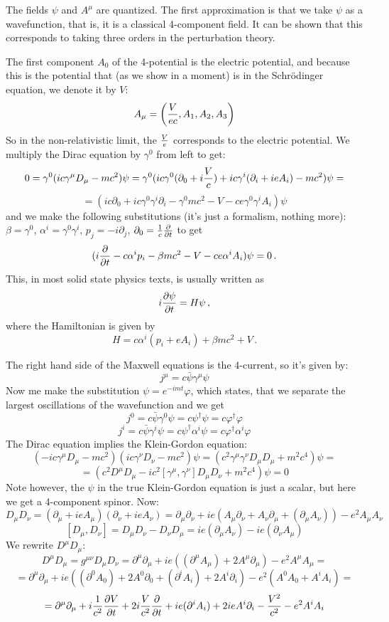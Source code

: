 The fields $\psi$ and $A^\mu$ are quantized. The first approximation is that we
take $\psi$ as a wavefunction, that is, it is a classical 4-component field. It
can be shown that this corresponds to taking three orders in the perturbation
theory.

The first component $A_0$ of the 4-potential is the electric potential, and
because this is the potential that (as we show in a moment) is in the
Schr\"odinger equation, we denote it by $V$:
$$A_\mu=\left({V\over ec},A_1,A_2,A_3\right)$$
So in the non-relativistic limit, the $V\over e$ corresponds to the electric
potential.  We multiply the Dirac equation by $\gamma^0$ from left to get:
$$0=\gamma^0(ic\gamma^\mu D_\mu-mc^2)\psi=
\gamma^0(ic\gamma^0(\partial_0+i{V\over c})+ic\gamma^i
(\partial_i+ieA_i)-mc^2)\psi=$$
$$=
(ic\partial_0+ic\gamma^0\gamma^i\partial_i-\gamma^0mc^2-V
-ce\gamma^0\gamma^iA_i)\psi
$$
and we make the following substitutions (it's just a formalism, nothing more):
$\beta=\gamma^0$, $\alpha^i=\gamma^0\gamma^i$, $p_j=-i\partial_j$,
$\partial_0={1\over c}{\partial\over\partial t}$
to get
$$(i{\partial\over\partial t}-c\alpha^i p_i-\beta
mc^2-V-ce\alpha^iA_i)\psi=0\,.$$
This, in most solid state physics texts, is usually written as
$$ i{\partial\psi\over\partial t}=H\psi\,,$$
where the Hamiltonian is given by
$$ H=c\alpha^i(p_i+eA_i)+\beta mc^2+V\,.$$

The right hand side of the Maxwell equations is the 4-current, so it's given
by:
$$j^\mu=c\bar\psi\gamma^\mu\psi$$
Now me make the substitution $\psi=e^{-imt}\varphi$, which states, that we
separate the largest oscillations of the wavefunction and we get
$$j^0=c\bar\psi\gamma^0\psi=c\psi^\dagger\psi=c\varphi^\dagger\varphi$$
$$j^i=c\bar\psi\gamma^i\psi=c\psi^\dagger\alpha^i\psi=c\varphi^\dagger\alpha^i\varphi$$
The Dirac equation implies the Klein-Gordon equation:
$$(-ic\gamma^\mu D_\mu-mc^2)(ic\gamma^\nu D_\nu-mc^2)\psi=
(c^2\gamma^\mu\gamma^\nu D_\mu D_\mu+m^2c^4)\psi=
$$
$$
=(c^2D^\mu D_\mu-ic^2[\gamma^\mu,\gamma^\nu]D_\mu D_\nu+m^2c^4)\psi=0$$
Note however, the $\psi$ in the true Klein-Gordon equation is just a scalar,
but here we get a 4-component spinor. Now:
$$
D_\mu D_\nu = (\partial_\mu+ieA_\mu)(\partial_\nu+ieA_\nu)=
\partial_\mu\partial_\nu+ie(A_\mu\partial_\nu+A_\nu\partial_\mu+
(\partial_\mu A_\nu))-e^2A_\mu A_\nu
$$
$$[D_\mu, D_\nu] = D_\mu D_\nu-D_\nu D_\mu=ie(\partial_\mu A_\nu)-
ie(\partial_\nu A_\mu)$$
We rewrite $D^\mu D_\mu$:
$$D^\mu D_\mu=g^{\mu\nu}D_\mu D_\nu=
\partial^\mu\partial_\mu+ie((\partial^\mu
A_\mu)+2A^\mu\partial_\mu) -e^2A^\mu A_\mu=$$
$$=\partial^\mu\partial_\mu+
ie((\partial^0 A_0)+2A^0\partial_0+(\partial^i A_i)+2A^i\partial_i)
-e^2(A^0A_0+A^i A_i)=$$
$$=\partial^\mu\partial_\mu
+i{1\over c^2}{\partial V\over\partial t}+
2i{V\over c^2}{\partial\over\partial t}
+ie(\partial^i A_i)+2ieA^i\partial_i
 -{V^2\over c^2}-e^2A^iA_i$$

